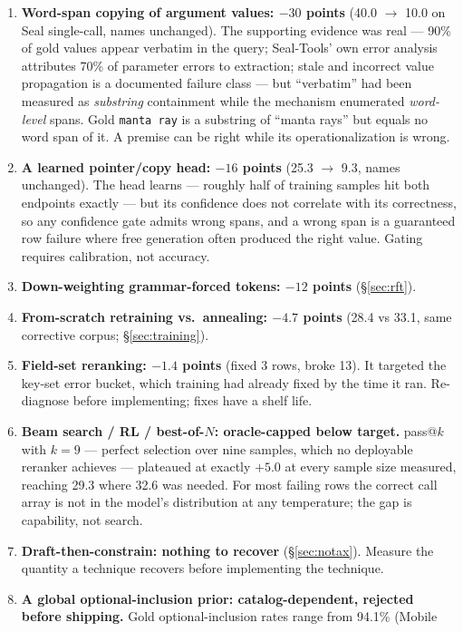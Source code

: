 \documentclass[10pt]{article}
\begin{document}
\begin{enumerate}
\item \textbf{Word-span copying of argument values: $-30$ points} (40.0
$\to$ 10.0 on Seal single-call, names unchanged). The supporting evidence was
real --- 90\% of gold values appear verbatim in the query; Seal-Tools' own
error analysis attributes 70\% of parameter errors to extraction; stale and
incorrect value propagation is a documented failure class \citep{funcbenchgen}
--- but
``verbatim'' had been measured as \emph{substring} containment while the
mechanism enumerated \emph{word-level} spans. Gold \texttt{manta ray} is a
substring of ``manta rays'' but equals no word span of it. A premise can be
right while its operationalization is wrong.
\item \textbf{A learned pointer/copy head: $-16$ points} (25.3 $\to$ 9.3,
names unchanged). The head learns --- roughly half of training samples hit
both endpoints exactly --- but its confidence does not correlate with its
correctness, so any confidence gate admits wrong spans, and a wrong span is a
guaranteed row failure where free generation often produced the right value.
Gating requires calibration, not accuracy.
\item \textbf{Down-weighting grammar-forced tokens: $-12$ points}
(\S\ref{sec:rft}).
\item \textbf{From-scratch retraining vs.\ annealing: $-4.7$ points} (28.4 vs
33.1, same corrective corpus; \S\ref{sec:training}).
\item \textbf{Field-set reranking: $-1.4$ points} (fixed 3 rows, broke 13).
It targeted the key-set error bucket, which training had already fixed by the
time it ran. Re-diagnose before implementing; fixes have a shelf life.
\item \textbf{Beam search / RL / best-of-$N$: oracle-capped below target.}
pass@$k$ \citep{codex} with $k{=}9$ --- perfect selection over nine samples,
which no deployable reranker achieves --- plateaued at exactly $+5.0$ at
every sample size measured,
reaching 29.3 where 32.6 was needed. For most failing rows the correct call
array is not in the model's distribution at any temperature; the gap is
capability, not search.
\item \textbf{Draft-then-constrain: nothing to recover} (\S\ref{sec:notax}).
Measure the quantity a technique recovers before implementing the technique.
\item \textbf{A global optional-inclusion prior: catalog-dependent, rejected
before shipping.} Gold optional-inclusion rates range from 94.1\% (Mobile

\end{enumerate}
\end{document}
